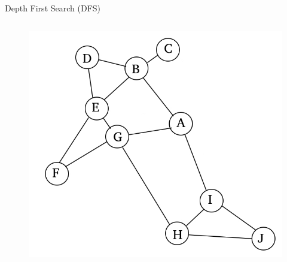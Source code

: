 \documentclass{beamer}
\begin{document}
\begin{frame}{Depth First Search (DFS)}
	\begin{columns}[T]
		\begin{column}{.48\textwidth}
			\begin{figure}
			\centering
				\includegraphics[width=1.3\linewidth]{example.jpg}
			\end{figure}
		\end{column}
		

\end{columns}
\end{frame}
\end{document}
